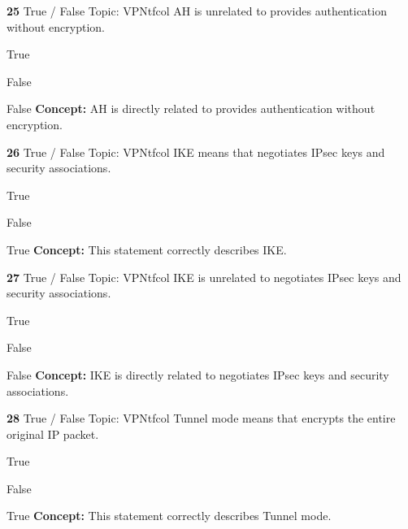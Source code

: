 \documentclass[10pt,a4paper]{article}
\begin{document}
\begin{qcard}{\color{white}\textbf{25} \hfill \small True / False \textbar{} Topic: VPN}{tfcol}
AH is unrelated to provides authentication without encryption.

\begin{qoptions}
\item True
\item False
\end{qoptions}
\begin{explainbox}{False}
\textbf{Concept:} AH is directly related to provides authentication without encryption.
\end{explainbox}
\end{qcard}

\begin{qcard}{\color{white}\textbf{26} \hfill \small True / False \textbar{} Topic: VPN}{tfcol}
IKE means that negotiates IPsec keys and security associations.

\begin{qoptions}
\item True
\item False
\end{qoptions}
\begin{explainbox}{True}
\textbf{Concept:} This statement correctly describes IKE.
\end{explainbox}
\end{qcard}

\begin{qcard}{\color{white}\textbf{27} \hfill \small True / False \textbar{} Topic: VPN}{tfcol}
IKE is unrelated to negotiates IPsec keys and security associations.

\begin{qoptions}
\item True
\item False
\end{qoptions}
\begin{explainbox}{False}
\textbf{Concept:} IKE is directly related to negotiates IPsec keys and security associations.
\end{explainbox}
\end{qcard}

\begin{qcard}{\color{white}\textbf{28} \hfill \small True / False \textbar{} Topic: VPN}{tfcol}
Tunnel mode means that encrypts the entire original IP packet.

\begin{qoptions}
\item True
\item False
\end{qoptions}
\begin{explainbox}{True}
\textbf{Concept:} This statement correctly describes Tunnel mode.
\end{explainbox}
\end{qcard}
\end{document}
